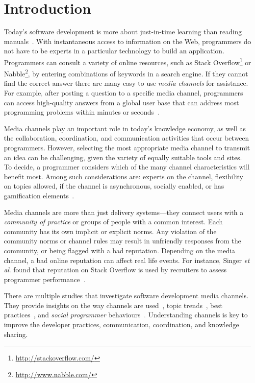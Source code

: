 \documentclass{sig-alternate-05-2015}
\begin{document}


\section{Introduction}
\label{cha:introduction}

	Today's software development is more about just-in-time learning than reading manuals~\cite{Hartmann2008}.
	With instantaneous access to information on the Web, programmers do not have to be experts in a particular technology to build an application.
	Programmers can consult a variety of online resources, such as Stack Overflow\footnote{\url{http://stackoverflow.com/}} or Nabble\footnote{\url{http://www.nabble.com/}}, by entering combinations of keywords in a search engine.
	If they cannot find the correct answer there are many easy-to-use \textit{media channels} for assistance. For example, after posting a question to a specific media channel, programmers can access high-quality answers from a global user base that can address most programming problems within minutes or seconds~\cite{Mamykina2011}.

	Media channels play an important role in today's knowledge economy, as well as the collaboration, coordination, and communication activities that occur between programmers. However, selecting the most appropriate media channel to transmit an idea can be challenging, given the variety of equally suitable tools and sites.
	To decide, a programmer considers which of the many channel characteristics will benefit most.
	Among such considerations are: experts on the channel, flexibility on topics allowed, if the channel is asynchronous, socially enabled, or has gamification elements~\cite{Vasilescu2014c}.

	Media channels are more than just delivery systems---they connect users with a \textit{community of practice} or groups of people with a common interest.
	Each community has its own implicit or explicit norms.
	Any violation of the community norms or channel rules may result in unfriendly responses from the community, or being flagged with a bad reputation.
	Depending on the media channel, a bad online reputation can affect real life events.
	For instance, Singer \textit{et al}. found that reputation on Stack Overflow is used by recruiters to assess programmer performance~\cite{Singer2013}.

	There are multiple studies that investigate software development media channels.
	They provide insights on the way channels are used~\cite{Guzzi2013, Storey2014, Singer2014},  topic trends~\cite{Barua2012, Kavaler2013, Wang2013d}, best practices~\cite{Asaduzzaman2013, Treude2011, Allamanis2013}, and \textit{social programmer} behaviours~\cite{Lang2013}.
	Understanding channels is key to improve the developer practices, communication, coordination, and knowledge sharing.
\end{document}
